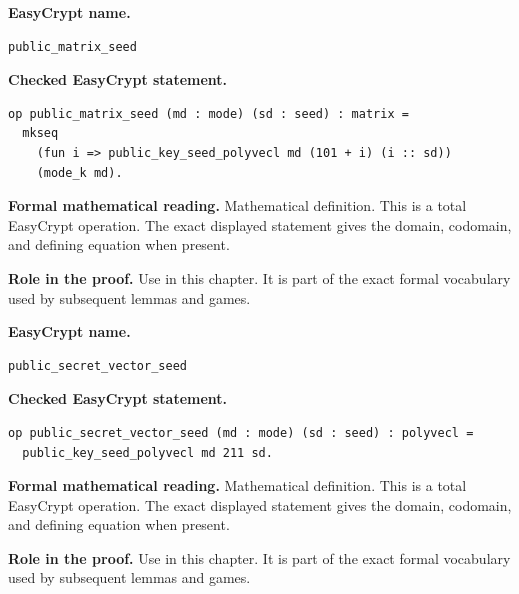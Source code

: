\begin{formaldefinition}
\noindent\textbf{EasyCrypt name.}
\begin{lstlisting}[language=EasyCrypt,basicstyle=\ttfamily\scriptsize]
public_matrix_seed
\end{lstlisting}
\noindent\textbf{Checked EasyCrypt statement.}
\begin{lstlisting}[language=EasyCrypt,basicstyle=\ttfamily\scriptsize]
op public_matrix_seed (md : mode) (sd : seed) : matrix =
  mkseq
    (fun i => public_key_seed_polyvecl md (101 + i) (i :: sd))
    (mode_k md).
\end{lstlisting}
\noindent\textbf{Formal mathematical reading.}
Mathematical definition. This is a total EasyCrypt operation.  The exact displayed statement gives the domain, codomain, and defining equation when present.

\noindent\textbf{Role in the proof.}
Use in this chapter. It is part of the exact formal vocabulary used by subsequent lemmas and games.

\end{formaldefinition}

\begin{formaldefinition}
\noindent\textbf{EasyCrypt name.}
\begin{lstlisting}[language=EasyCrypt,basicstyle=\ttfamily\scriptsize]
public_secret_vector_seed
\end{lstlisting}
\noindent\textbf{Checked EasyCrypt statement.}
\begin{lstlisting}[language=EasyCrypt,basicstyle=\ttfamily\scriptsize]
op public_secret_vector_seed (md : mode) (sd : seed) : polyvecl =
  public_key_seed_polyvecl md 211 sd.
\end{lstlisting}
\noindent\textbf{Formal mathematical reading.}
Mathematical definition. This is a total EasyCrypt operation.  The exact displayed statement gives the domain, codomain, and defining equation when present.

\noindent\textbf{Role in the proof.}
Use in this chapter. It is part of the exact formal vocabulary used by subsequent lemmas and games.

\end{formaldefinition}


